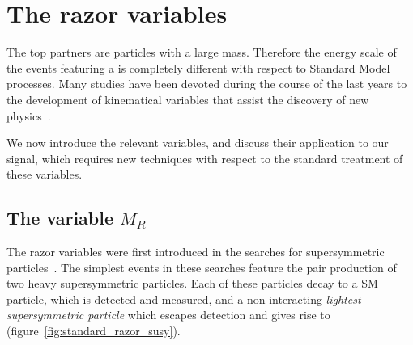 \chapter{The razor variables}
The top partners are particles with a large mass. Therefore the energy scale
of the events featuring a \TP is completely different with respect to
Standard Model processes. Many studies have been devoted during the course
of the last years to the development of kinematical variables that assist
the discovery of new
physics~\cite{Rogan:2010kb,PhysRevLett.101.221803,Allanach:2000kt,Hubisz:2008gg,Polesello:2009rn}.

We now introduce the relevant variables, and discuss their application to
our signal, which requires new techniques with respect to the standard
treatment of these variables.

\section{The variable $M_R$}\label{sec:mr}
The razor variables were first introduced in the searches for supersymmetric
particles~\cite{CMS-PAS-SUS-11-024}. The simplest events in these searches
feature the pair production of two heavy supersymmetric particles. Each of
these particles decay to a SM particle, which is detected and measured, and
a non-interacting \emph{lightest supersymmetric particle} which escapes
detection and gives rise to \met (figure~\ref{fig:standard_razor_susy}).

